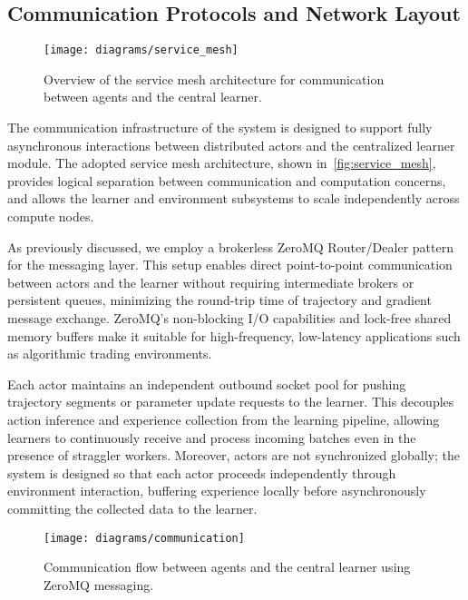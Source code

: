 \documentclass[11pt]{article}
\begin{document}
    \subsection{Communication Protocols and Network Layout}
    \label{subsec:communication}

    \begin{figure}[htb]
        \centering
        \texttt{[image: diagrams/service\_mesh]}
        \caption{Overview of the service mesh architecture for communication between agents and the central learner.}
        \label{fig:service_mesh}
    \end{figure}

    The communication infrastructure of the system is designed to support fully asynchronous interactions
    between distributed actors and the centralized learner module.
    The adopted service mesh architecture, shown in~\autoref{fig:service_mesh}, provides logical separation between communication and computation concerns,
    and allows the learner and environment subsystems to scale independently across compute nodes.

    As previously discussed, we employ a brokerless ZeroMQ Router/Dealer pattern for the messaging layer.
    This setup enables direct point-to-point communication between actors and the learner without requiring intermediate brokers or persistent queues,
    minimizing the round-trip time of trajectory and gradient message exchange.
    ZeroMQ's non-blocking I/O capabilities and lock-free shared memory buffers make it suitable for high-frequency,
    low-latency applications such as algorithmic trading environments.

    Each actor maintains an independent outbound socket pool for pushing trajectory segments or parameter update requests to the learner.
    This decouples action inference and experience collection from the learning pipeline,
    allowing learners to continuously receive and process incoming batches even in the presence of straggler workers.
    Moreover, actors are not synchronized globally; the system is designed so that each actor proceeds independently through environment interaction,
    buffering experience locally before asynchronously committing the collected data to the learner.

    \begin{figure}[htb]
        \centering
        \texttt{[image: diagrams/communication]}
        \caption{Communication flow between agents and the central learner using ZeroMQ messaging.}
        \label{fig:communication}
    \end{figure}
\end{document}
